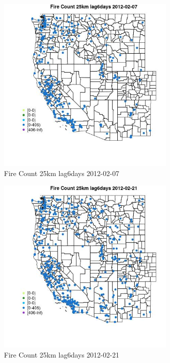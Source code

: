 \begin{figure} 
\centering  
\includegraphics[width=0.77\textwidth]{Code_Outputs/Report_ML_input_PM25_Step4_part_f_de_duplicated_aves_prioritize_24hr_obswNAs_MapObsFire_Count_25km_lag6days2012-02-07.jpg} 
\caption{\label{fig:Report_ML_input_PM25_Step4_part_f_de_duplicated_aves_prioritize_24hr_obswNAsMapObsFire_Count_25km_lag6days2012-02-07}Fire Count 25km lag6days 2012-02-07} 
\end{figure} 
 

\begin{figure} 
\centering  
\includegraphics[width=0.77\textwidth]{Code_Outputs/Report_ML_input_PM25_Step4_part_f_de_duplicated_aves_prioritize_24hr_obswNAs_MapObsFire_Count_25km_lag6days2012-02-21.jpg} 
\caption{\label{fig:Report_ML_input_PM25_Step4_part_f_de_duplicated_aves_prioritize_24hr_obswNAsMapObsFire_Count_25km_lag6days2012-02-21}Fire Count 25km lag6days 2012-02-21} 
\end{figure} 
 

